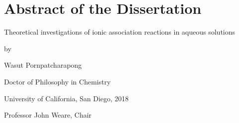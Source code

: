 
\begingroup
\vspace*{1.5in}
\chapter*{Abstract of the Dissertation}
\endgroup

\vspace{1.2cm}

\begin{center}
    Theoretical investigations of ionic association reactions in aqueous solutions

    \vspace{0.6cm}

    by

    \vspace{0.6cm}

    \begin{spacing}{1.0}
        Wasut Pornpatcharapong

        Doctor of Philosophy in Chemistry

        University of California, San Diego, 2018
    \end{spacing}

    \vspace{0.6cm}

    Professor John Weare, Chair
\end{center}

\vspace{0.6cm}

\begin{spacing}{2.0}
    \lipsum[1-3]
\end{spacing}
